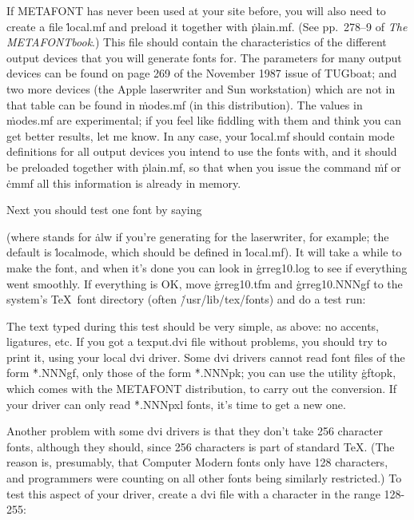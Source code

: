 If METAFONT has never been used at your site before, you will
also need to create a file \.{local.mf} and preload it together
with \.{plain.mf}.  (See pp.~278--9 of {\it The METAFONTbook}.)
This file
should contain the characteristics of the different output
devices that you will generate fonts for.  The parameters
for many output devices can be found on page 269 of the November
1987 issue of TUGboat; and two more devices (the Apple laserwriter
and Sun workstation) which are not in that table can be found
in \.{modes.mf} (in this distribution).  The values in \.{modes.mf}
are experimental; if you feel like fiddling with them and think
you can get better results, let me know.  In any case, your
\.{local.mf} should contain mode definitions for all output devices
you intend to use the fonts with, and it should be preloaded
together with \.{plain.mf}, so that when you issue the command
\.{mf} or \.{cmmf} all this information is already in memory.

Next you should test one font by saying

\smallskip
{}
\smallskip

(where  stands for \.{alw} if you're generating
for the laserwriter, for example; the default is
\.{localmode}, which should be defined in \.{local.mf}).
It will take a while to make the font, and when
it's done you can look in \.{grreg10.log} to see if everything went
smoothly.  If everything is OK, move \.{grreg10.tfm}
and \.{grreg10.NNNgf} to the system's \TeX\ font directory (often
\.{/usr/lib/tex/fonts}) and do a test run:

\smallskip
{}
\disp{\%}
\smallskip

The text typed during this test should be very simple, as above:
no accents, ligatures, etc.  If you got a \.{texput.dvi} file without
problems, you should try to print it, using your local dvi driver.
Some dvi drivers cannot read font files of the form \.{*.NNNgf},
only those of the form \.{*.NNNpk}; you can use the utility
\.{gftopk}, which comes with the METAFONT distribution, to carry
out the conversion.  If your driver can only read \.{*.NNNpxl} fonts,
it's time to get a new one.

Another problem with some dvi drivers is that they don't
take 256 character fonts, although they should, since 256 characters
is part of standard \TeX.  (The reason is, presumably, that Computer
Modern fonts only have 128 characters, and programmers were counting
on all other fonts being similarly restricted.)  To test this
aspect of your driver, create a dvi file with a character in the
range 128-255:

